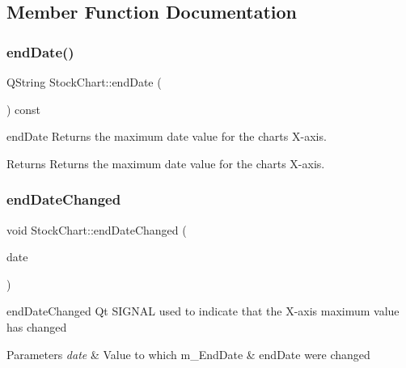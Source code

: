 \subsection{Member Function Documentation}
\mbox{\label{class_stock_chart_a0c4ea05e46ed7c7b200063ec34241db1}} 
\subsubsection{\texorpdfstring{end\+Date()}{endDate()}}
{\footnotesize\ttfamily Q\+String Stock\+Chart\+::end\+Date (\begin{DoxyParamCaption}{ }\end{DoxyParamCaption}) const}



end\+Date Returns the maximum date value for the chart\textquotesingle{}s X-\/axis. 

\begin{DoxyReturn}{Returns}
Returns the maximum date value for the chart\textquotesingle{}s X-\/axis. 
\end{DoxyReturn}
\mbox{\label{class_stock_chart_a4f7074ac61cf94ca61eb85d6869846c3}} 
\subsubsection{\texorpdfstring{end\+Date\+Changed}{endDateChanged}}
{\footnotesize\ttfamily void Stock\+Chart\+::end\+Date\+Changed (\begin{DoxyParamCaption}\item[{const Q\+String \&}]{date }\end{DoxyParamCaption})\hspace{0.3cm}{\ttfamily [signal]}}



end\+Date\+Changed Qt S\+I\+G\+N\+AL used to indicate that the X-\/axis maximum value has changed 


\begin{DoxyParams}{Parameters}
{\em date} & Value to which m\+\_\+\+End\+Date \& end\+Date were changed \\
\hline
\end{DoxyParams}
\mbox{\label{class_stock_chart_ab108485d635146b2dc9bb1192c4371ec}} 

